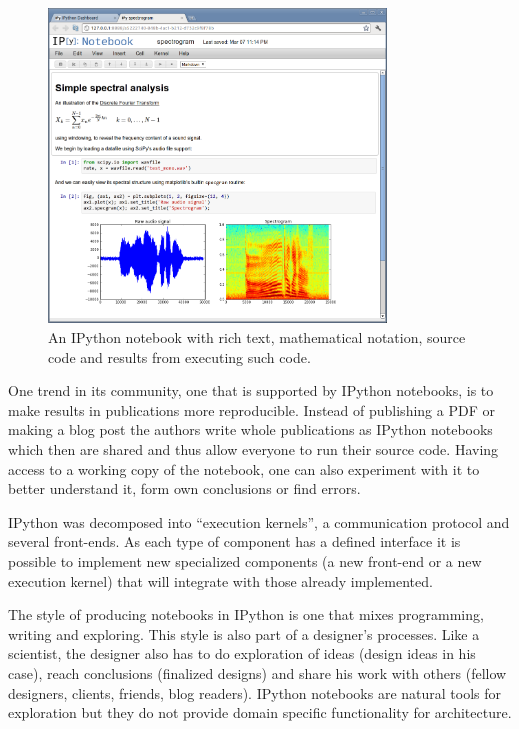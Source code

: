 \documentclass{./llncs2e/llncs}
\begin{document}
	\begin{figure}
		\centering
		\includegraphics[width=0.8\textwidth]{img/ipython_notebook}
		\caption{An IPython notebook with rich text, mathematical notation, source code and results from executing such code.}
		\label{fig:ipython:notebook}
	\end{figure}
	
	One trend in its community, one that is supported by IPython notebooks, is to make results in publications more reproducible. 
	Instead of publishing a PDF or making a blog post the authors write whole publications as IPython notebooks which then are shared and thus allow everyone to run their source code. 
	Having access to a working copy of the notebook, one can also experiment with it to better understand it, form own conclusions or find errors.
	
	
	IPython was decomposed into ``execution kernels'', a communication protocol and several front-ends. 
	As each type of component has a defined interface it is possible to implement new specialized components (a new front-end or a new execution kernel) that will integrate with those already implemented.
	
	The style of producing notebooks in IPython is one that mixes programming, writing and exploring. 
	This style is also part of a designer's processes. 
	Like a scientist, the designer also has to do exploration of ideas (design ideas in his case), reach conclusions (finalized designs) and share his work with others (fellow designers, clients, friends, blog readers). 
	IPython notebooks are natural tools for exploration but they do not provide domain specific functionality for architecture.
	
\end{document}

